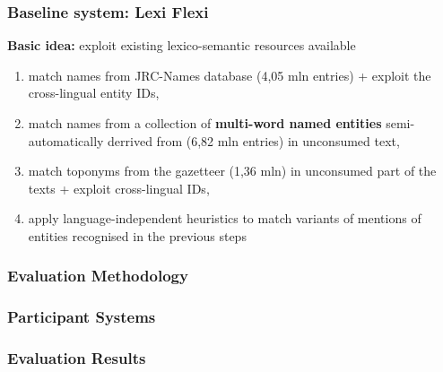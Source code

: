 \documentclass{beamer}
\begin{document}
\begin{frame}[fragile]
 \frametitle{Baseline system: Lexi Flexi}

\textbf{Basic idea:} exploit existing lexico-semantic resources available

\begin{enumerate}

\item match names from {\color{red}JRC-Names} database (4,05 mln entries) + exploit the cross-lingual entity IDs,

\vspace{0.2cm}

\item match names from a collection of \textbf{multi-word named entities} semi-automatically derrived from {\color{red}{\sc Babelnet}} (6,82 mln entries) in unconsumed text,

\vspace{0.2cm}

\item match toponyms from the {\color{red}{\sc GeoNames}} gazetteer (1,36 mln) in unconsumed part of the texts + exploit cross-lingual IDs,

\vspace{0.2cm}

\item apply language-independent heuristics to match variants of mentions of entities recognised in the previous steps

\end{enumerate}

\end{frame}

\begin{frame}
 \frametitle{Evaluation Methodology}

\end{frame}


\begin{frame}
 \frametitle{Participant Systems}

\end{frame}

\begin{frame}
 \frametitle{Evaluation Results}

\end{frame}
\end{document}
